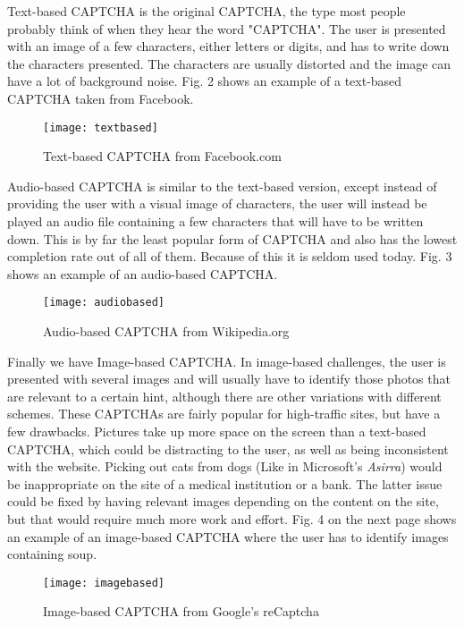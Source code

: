 \documentclass[a4paper]{IEEEtran}
\begin{document}
Text-based CAPTCHA is the original CAPTCHA, the type most people probably think of when they hear the word "CAPTCHA". The user is presented with an image of a few characters, either letters or digits, and has to write down the characters presented. The characters are usually distorted and the image can have a lot of background noise. Fig. 2 shows an example of a text-based CAPTCHA taken from Facebook. 

\begin{figure}
\centering
\texttt{[image: textbased]}
\caption[Text-based CAPTCHA]{Text-based CAPTCHA from Facebook.com}
\label{Text-based CAPTCHA}
\end{figure}

Audio-based CAPTCHA is similar to the text-based version, except instead of providing the user with a visual image of characters, the user will instead be played an audio file containing a few characters that will have to be written down. This is by far the least popular form of CAPTCHA and also has the lowest completion rate out of all of them. Because of this it is seldom used today. Fig. 3 shows an example of an audio-based CAPTCHA.

\begin{figure}[h]
\centering
\texttt{[image: audiobased]}
\caption[Audio-based CAPTCHA]{Audio-based CAPTCHA from Wikipedia.org}
\label{Audio-based CAPTCHA}
\end{figure}

Finally we have Image-based CAPTCHA. In image-based challenges, the user is presented with several images and will usually have to identify those photos that are relevant to a certain hint, although there are other variations with different schemes. These CAPTCHAs are fairly popular for high-traffic sites, but have a few drawbacks. Pictures take up more space on the screen than a text-based CAPTCHA, which could be distracting to the user, as well as being inconsistent with the website. Picking out cats from dogs (Like in Microsoft's \textit{Asirra}) would be inappropriate on the site of a medical institution or a bank. The latter issue could be fixed by having relevant images depending on the content on the site, but that would require much more work and effort. Fig. 4 on the next page shows an example of an image-based CAPTCHA where the user has to identify images containing soup.

\begin{figure}[h]
\centering
\texttt{[image: imagebased]}
\caption[Image-based CAPTCHA]{Image-based CAPTCHA from Google's reCaptcha}
\label{Image-based CAPTCHA}
\end{figure}
\end{document}
